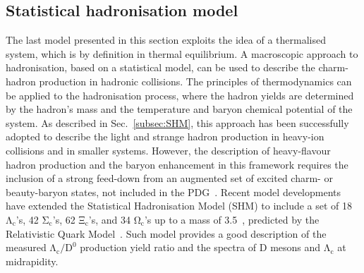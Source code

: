 \subsection{Statistical hadronisation model}
The last model presented in this section exploits the idea of a thermalised system, which is by definition in thermal equilibrium. A macroscopic approach to hadronisation, based on a statistical model, can be used to describe the charm-hadron production in hadronic collisions. The principles of thermodynamics can be applied to the hadronisation process, where the hadron yields are determined by the hadron's mass and the temperature and baryon chemical potential of the system. As described in Sec.~\ref{subsec:SHM}, this approach has been successfully adopted to describe the light and strange hadron production in heavy-ion collisions and in smaller systems. However, the description of heavy-flavour hadron production and the baryon enhancement in this framework requires the inclusion of a strong feed-down from an augmented set of excited charm- or beauty-baryon states, not included in the PDG~\cite{pdg}. Recent model developments~\cite{He:2019tik,He:2022tod} have extended the Statistical Hadronisation Model (SHM) to include a set of 18 $\mathrm{\Lambda_c}$'s, 42 $\mathrm{\Sigma_c}$'s, 62 $\mathrm{\Xi_c}$'s, and 34 $\mathrm{\Omega_c}$'s up to a mass of 3.5~\gev, predicted by the Relativistic Quark Model~\cite{Ebert:2011kk}. Such model provides a good description of the measured $\mathrm{\Lambda_c/D^0}$ production yield ratio and the \pt spectra of D mesons and $\mathrm{\Lambda_c}$ at midrapidity.

